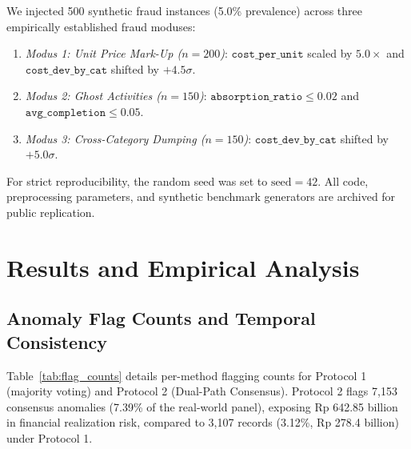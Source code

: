 \documentclass[conference]{IEEEtran}
\begin{document}
We injected 500 synthetic fraud instances (5.0\% prevalence) across three empirically established fraud moduses:
\begin{enumerate}
    \item \textit{Modus 1: Unit Price Mark-Up ($n=200$)}: $\texttt{cost\_per\_unit}$ scaled by $5.0\times$ and $\texttt{cost\_dev\_by\_cat}$ shifted by $+4.5\sigma$.
    \item \textit{Modus 2: Ghost Activities ($n=150$)}: $\texttt{absorption\_ratio} \le 0.02$ and $\texttt{avg\_completion} \le 0.05$.
    \item \textit{Modus 3: Cross-Category Dumping ($n=150$)}: $\texttt{cost\_dev\_by\_cat}$ shifted by $+5.0\sigma$.
\end{enumerate}
For strict reproducibility, the random seed was set to $\text{seed} = 42$. All code, preprocessing parameters, and synthetic benchmark generators are archived for public replication.

\section{Results and Empirical Analysis}

\subsection{Anomaly Flag Counts and Temporal Consistency}

Table~\ref{tab:flag_counts} details per-method flagging counts for Protocol 1 (majority voting) and Protocol 2 (Dual-Path Consensus). Protocol 2 flags 7,153 consensus anomalies (7.39\% of the real-world panel), exposing Rp 642.85 billion in financial realization risk, compared to 3,107 records (3.12\%, Rp 278.4 billion) under Protocol 1.

\begin{table}[htbp]
\centering
\caption{Anomaly Flagging Counts and Realization Risk ($N = 96,778$)}
\label{tab:flag_counts}
\setlength{\tabcolsep}{3pt}
\end{table}
\end{document}

